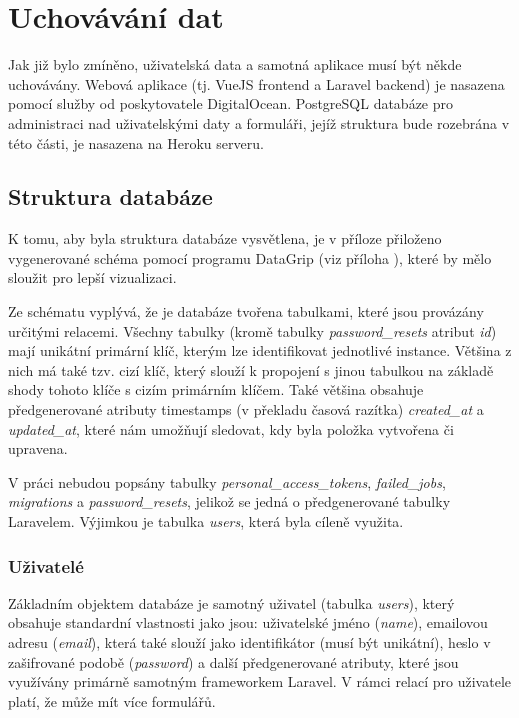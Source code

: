 \section{Uchovávání dat}
Jak již bylo zmíněno, uživatelská data a samotná aplikace musí být někde uchovávány. Webová aplikace (tj. VueJS frontend a Laravel backend) je nasazena pomocí služby  od poskytovatele DigitalOcean. PostgreSQL databáze pro administraci nad uživatelskými daty a formuláři, jejíž struktura bude rozebrána v této části, je nasazena na Heroku serveru. 

	\subsection{Struktura databáze}
	K tomu, aby byla struktura databáze vysvětlena, je v příloze přiloženo vygenerované schéma pomocí programu DataGrip (viz příloha ), které by mělo sloužit pro lepší vizualizaci. 
	
	Ze schématu vyplývá, že je databáze tvořena tabulkami, které jsou provázány určitými relacemi. Všechny tabulky (kromě tabulky \textit{password\_resets} atribut \textit{id}) mají unikátní primární klíč, kterým lze identifikovat jednotlivé instance. Většina z nich má také tzv. cizí klíč, který slouží k propojení s jinou tabulkou na základě shody tohoto klíče s cizím primárním klíčem. Také většina obsahuje předgenerované atributy timestamps (v překladu časová razítka) \textit{created\_at} a \textit{updated\_at}, které nám umožňují sledovat, kdy byla položka vytvořena či upravena.
	
	V práci nebudou popsány tabulky \textit{personal\_access\_tokens}, \textit{failed\_jobs}, \textit{migrations} a \textit{password\_resets}, jelikož se jedná o předgenerované tabulky Laravelem. Výjimkou je tabulka \textit{users}, která byla cíleně využita.
	
	\subsubsection{Uživatelé}
	Základním objektem databáze je samotný uživatel (tabulka \textit{users}), který obsahuje standardní vlastnosti jako jsou: uživatelské jméno (\textit{name}), emailovou adresu (\textit{email}), která také slouží jako identifikátor (musí být unikátní), heslo v zašifrované podobě (\textit{password}) a další předgenerované atributy, které jsou využívány primárně samotným frameworkem Laravel. V rámci relací pro uživatele platí, že může mít více formulářů.
	

